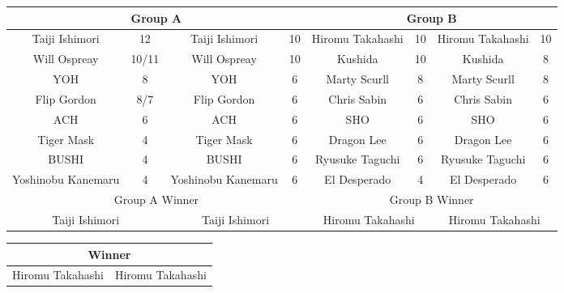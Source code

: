 \documentclass[landscape]{article}
\newcommand{\RN}[1]{%
  \textup{\uppercase\expandafter{\romannumeral#1}}%
}
\begin{document}
\vspace{10pt}
\begin{tabular}{|c|c|c|c|c|c|c|c|}
  \hline
  \multicolumn{4}{|c|}{\cellcolor{Thistle} Group A} & \multicolumn{4}{|c|}{\cellcolor{Aquamarine} Group B} \\
  \hline
  Taiji Ishimori & 12 & Taiji Ishimori & 10 & Hiromu Takahashi & 10 & Hiromu Takahashi & 10 \\
  \hline
  Will Ospreay & 10/11 & Will Ospreay & 10 & Kushida & 10 & Kushida & 8 \\
  \hline
  YOH & 8 & YOH & 6 & Marty Scurll & 8 & Marty Scurll & 8 \\
  \hline
  Flip Gordon & 8/7 & Flip Gordon & 6 & Chris Sabin & 6 & Chris Sabin & 6 \\
  \hline
  ACH & 6 & ACH & 6 & SHO & 6 & SHO & 6 \\
  \hline
  Tiger Mask \RN{4} & 4 & Tiger Mask \RN{4} & 6 & Dragon Lee & 6 & Dragon Lee & 6 \\
  \hline
  BUSHI & 4 & BUSHI & 6 & Ryusuke Taguchi & 6 & Ryusuke Taguchi & 6 \\
  \hline
  Yoshinobu Kanemaru & 4 & Yoshinobu Kanemaru & 6 & El Desperado & 4 & El Desperado & 6 \\
  \hline\hline
  \multicolumn{4}{|c|}{\cellcolor{magenta} Group A Winner} & \multicolumn{4}{|c|}{\cellcolor{cyan} Group B Winner} \\
  \hline
  \multicolumn{2}{|c|}{Taiji Ishimori} & \multicolumn{2}{|c|}{Taiji Ishimori} & \multicolumn{2}{|c|}{Hiromu Takahashi} & \multicolumn{2}{|c|}{Hiromu Takahashi} \\
  \hline
\end{tabular}

\vspace{10pt}
\begin{tabular}{|c|c|}
  \hline
  \multicolumn{2}{|c|}{\cellcolor{orange} Winner} \\
  \hline
  Hiromu Takahashi & Hiromu Takahashi \\
  \hline
\end{tabular}
\end{document}
